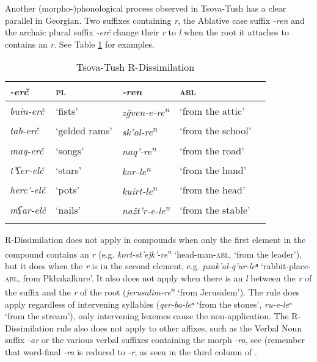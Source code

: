Another (morpho-)phonological process observed in Tsova-Tush has a clear parallel in Georgian. 
Two suffixes containing \textit{r}, the Ablative case suffix \textit{-ren} and the archaic plural suffix \textit{-erč} change their \textit{r} to \textit{l} when the root it attaches to contains an \textit{r}. See Table \ref{table-dissim} for examples.

\begin{table}
	\begin{tabular}{lllll}
    \lsptoprule
		\textit{-erč} & {\textsc{pl}} & {\textit{-ren}} & {\textsc{abl}} \\
		\midrule
		\textit{buin-erč} & `fists' & \textit{z\u{g}ven-e-re\textsuperscript{n}} & `from the attic' \\
		\textit{tab-erč} & `gelded rams' & \textit{sk'ol-re\textsuperscript{n}} & `from the school' \\
		\textit{maq-erč} & `songs' & \textit{naq'-re\textsuperscript{n}} & `from the road' \\
		\midrule
		
		\textit{t'ʕer-elč} & `stars' & \textit{kor-le\textsuperscript{n}} & `from the hand' \\
		\textit{herc'-elč} & `pots' & \textit{kuirt-le\textsuperscript{n}} & `from the head' \\
		\textit{mʕar-elč} & `nails' & \textit{nažt'r-e-le\textsuperscript{n}} & `from the stable' \\
		
		\lspbottomrule
	\end{tabular}
	\caption{Tsova-Tush R-Dissimilation}
	\label{table-dissim}
\end{table}

R-Dissimilation does not apply in compounds when only the first element in the compound contains an \textit{r} (e.g. \textit{kort-st'ejk'-re\textsuperscript{n}} `head-man-\textsc{abl}, `from the leader'), but it does when the \textit{r} is in the second element, e.g. \textit{pxak'al-q'ur-leⁿ} `rabbit-place-\textsc{abl}, from Pkhakalkure'. It also does not apply when there is an \textit{l} between the \textit{r} of the suffix and the \textit{r} of the root (\textit{jerusalim-re\textsuperscript{n}} `from Jerusalem'). The rule does apply regardless of intervening syllables (\textit{qer-ba-leⁿ} `from the stones', \textit{ru-e-leⁿ} `from the stream'), only intervening lexemes cause the non-application. The R-Dissimilation rule also does not apply to other affixes, such as the Verbal Noun suffix \textit{-ar} or the various verbal suffixes containing the morph \textit{-ra}, see  (remember that word-final \textit{-ra} is reduced to \textit{-r}, as seen in the third column of . 

